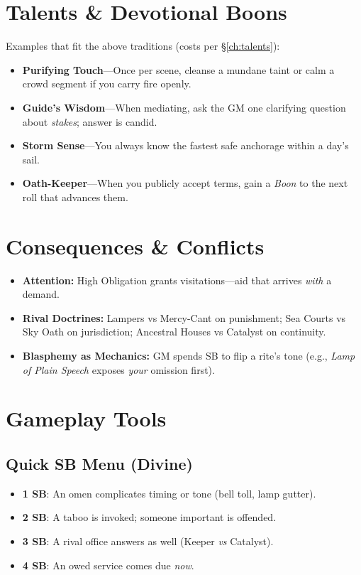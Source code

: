 \section{Talents \& Devotional Boons}
Examples that fit the above traditions (costs per \S\ref{ch:talents}):
\begin{itemize}
  \item \textbf{Purifying Touch}—Once per scene, cleanse a mundane taint or calm a crowd segment if you carry fire openly.
  \item \textbf{Guide's Wisdom}—When mediating, ask the GM one clarifying question about \emph{stakes}; answer is candid.
  \item \textbf{Storm Sense}—You always know the fastest safe anchorage within a day's sail.
  \item \textbf{Oath-Keeper}—When you publicly accept terms, gain a \emph{Boon} to the next roll that advances them.
\end{itemize}

\section{Consequences \& Conflicts}
\begin{itemize}
  \item \textbf{Attention:} High Obligation grants visitations—aid that arrives \emph{with} a demand.
  \item \textbf{Rival Doctrines:} Lampers vs Mercy-Cant on punishment; Sea Courts vs Sky Oath on jurisdiction; Ancestral Houses vs Catalyst on continuity.
  \item \textbf{Blasphemy as Mechanics:} GM spends SB to flip a rite's tone (e.g., \emph{Lamp of Plain Speech} exposes \emph{your} omission first).
\end{itemize}

\section{Gameplay Tools}
\subsection*{Quick SB Menu (Divine)}
\begin{itemize}
  \item \textbf{1 SB}: An omen complicates timing or tone (bell toll, lamp gutter).
  \item \textbf{2 SB}: A taboo is invoked; someone important is offended.
  \item \textbf{3 SB}: A rival office answers as well (Keeper \emph{vs} Catalyst).
  \item \textbf{4 SB}: An owed service comes due \emph{now}.
\end{itemize}

